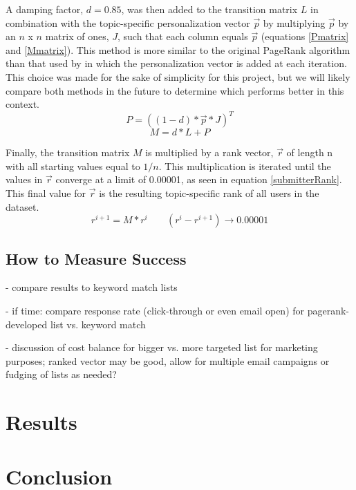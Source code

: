 \documentclass[]{report}   %
\begin{document}
A damping factor, $d = 0.85$, was then added to the transition matrix $L$ in combination with the topic-specific personalization vector $\vec{p}$ by multiplying $\vec{p}$ by an $n$ x $n$ matrix of ones, $J$, such that each column equals $\vec{p}$ (equations \ref{Pmatrix} and \ref{Mmatrix}). This method is more similar to the original PageRank algorithm than that used by  in which the personalization vector is added at each iteration. This choice was made for the sake of simplicity for this project, but we will likely compare both methods in the future to determine which performs better in this context.
\begin{equation}
\label{Pmatrix}
P=((1-d)*\vec{p}*J)^{T}
\end{equation}
\begin{equation}
\label{Mmatrix}
M=d*L+P
\end{equation}

Finally, the transition matrix $M$ is multiplied by a rank vector, $\vec{r}$ of length n with all starting values equal to $1/n$. This multiplication is iterated until the values in $\vec{r}$ converge at a limit of 0.00001, as seen in equation \ref{submitterRank}. This final value for $\vec{r}$ is the resulting topic-specific rank of all users in the dataset.
\begin{equation}
\label{submitterRank}
r^{i+1}=M*r^{i} \;\; \;\;\;\;\;(r^{i}-r^{i+1})\rightarrow0.00001
\end{equation}

\section{How to Measure Success}

- compare results to keyword match lists

- if time: compare response rate (click-through or even email open) for pagerank-developed list vs. keyword match

- discussion of cost balance for bigger vs. more targeted list for marketing purposes; ranked vector may be good, allow for multiple email campaigns or fudging of lists as needed?

\chapter{Results}
\chapter{Conclusion}        
\end{document}
